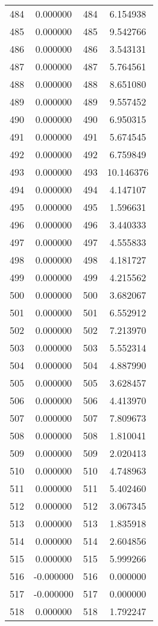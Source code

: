 \documentclass[12pt]{article}
\begin{document}
\begin{longtable}{@{}cccc@{}}
484 & 0.000000 & 484 & 6.154938 \\
485 & 0.000000 & 485 & 9.542766 \\
486 & 0.000000 & 486 & 3.543131 \\
487 & 0.000000 & 487 & 5.764561 \\
488 & 0.000000 & 488 & 8.651080 \\
489 & 0.000000 & 489 & 9.557452 \\
490 & 0.000000 & 490 & 6.950315 \\
491 & 0.000000 & 491 & 5.674545 \\
492 & 0.000000 & 492 & 6.759849 \\
493 & 0.000000 & 493 & 10.146376 \\
494 & 0.000000 & 494 & 4.147107 \\
495 & 0.000000 & 495 & 1.596631 \\
496 & 0.000000 & 496 & 3.440333 \\
497 & 0.000000 & 497 & 4.555833 \\
498 & 0.000000 & 498 & 4.181727 \\
499 & 0.000000 & 499 & 4.215562 \\
500 & 0.000000 & 500 & 3.682067 \\
501 & 0.000000 & 501 & 6.552912 \\
502 & 0.000000 & 502 & 7.213970 \\
503 & 0.000000 & 503 & 5.552314 \\
504 & 0.000000 & 504 & 4.887990 \\
505 & 0.000000 & 505 & 3.628457 \\
506 & 0.000000 & 506 & 4.413970 \\
507 & 0.000000 & 507 & 7.809673 \\
508 & 0.000000 & 508 & 1.810041 \\
509 & 0.000000 & 509 & 2.020413 \\
510 & 0.000000 & 510 & 4.748963 \\
511 & 0.000000 & 511 & 5.402460 \\
512 & 0.000000 & 512 & 3.067345 \\
513 & 0.000000 & 513 & 1.835918 \\
514 & 0.000000 & 514 & 2.604856 \\
515 & 0.000000 & 515 & 5.999266 \\
516 & -0.000000 & 516 & 0.000000 \\
517 & -0.000000 & 517 & 0.000000 \\
518 & 0.000000 & 518 & 1.792247 \\

\end{longtable}
\end{document}
